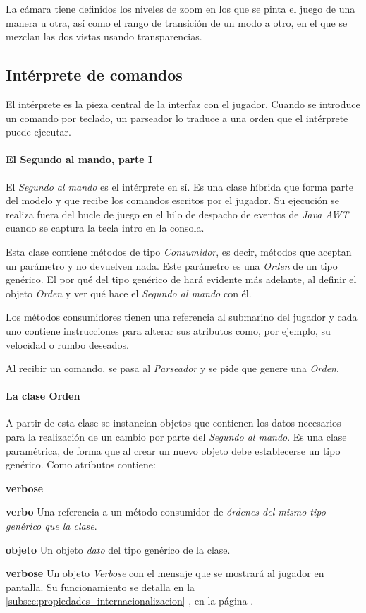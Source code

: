 \documentclass[a4paper,
	11pt,
	parskip=full,
	bibliography=totoc,
	twoside
	]{scrartcl}
\begin{document}
			La cámara tiene definidos los niveles de zoom en los que se pinta el juego de una manera u otra, así como el rango de transición de un modo a otro, en el que se mezclan las dos vistas usando transparencias.
	
	\subsection{Intérprete de comandos}
	\label{subsec:interprete_comandos}
		El intérprete es la pieza central de la interfaz con el jugador. Cuando se introduce un comando por teclado, un parseador lo traduce a una orden que el intérprete puede ejecutar.
		
		\paragraph{El Segundo al mando, parte I}
			El \textit{Segundo al mando} es el intérprete en sí. Es una clase híbrida que forma parte del modelo y que recibe los comandos escritos por el jugador. Su ejecución se realiza fuera del bucle de juego en el hilo de despacho de eventos de \textit{Java AWT} cuando se captura la tecla intro en la consola.
			
			Esta clase contiene métodos de tipo \textit{Consumidor}, es decir, métodos que aceptan un parámetro y no devuelven nada. Este parámetro es una \textit{Orden} de un tipo genérico. El por qué del tipo genérico de hará evidente más adelante, al definir el objeto \textit{Orden} y ver qué hace el \textit{Segundo al mando} con él.
			
			Los métodos consumidores tienen una referencia al submarino del jugador y cada uno contiene instrucciones para alterar sus atributos como, por ejemplo, su velocidad o rumbo deseados.
			
			Al recibir un comando, se pasa al \textit{Parseador} y se pide que genere una \textit{Orden}.
			
		\paragraph{La clase Orden}
			A partir de esta clase se instancian objetos que contienen los datos necesarios para la realización de un cambio por parte del \textit{Segundo al mando}. Es una clase paramétrica, de forma que al crear un nuevo objeto debe establecerse un tipo genérico. Como atributos contiene:
			\begin{labeling}{\textbf{verbose}}
				\item[\textbf{verbo}] Una referencia a un método consumidor de \textit{órdenes del mismo tipo genérico que la clase}.
				\item[\textbf{objeto}] Un objeto \textit{dato} del tipo genérico de la clase.
				\item[\textbf{verbose}] Un objeto \textit{Verbose} con el mensaje que se mostrará al jugador en pantalla. Su funcionamiento se detalla en la \autoref{subsec:propiedades_internacionalizacion} , en la página \pageref{subsec:propiedades_internacionalizacion}.
			\end{labeling}
		
\end{document}
